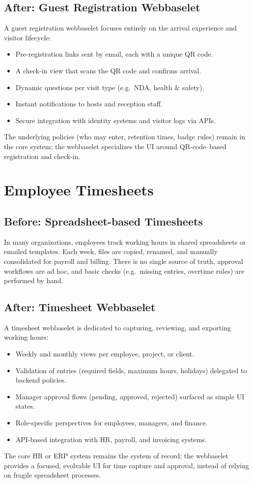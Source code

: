 \subsection*{After: Guest Registration Webbaselet}
A guest registration webbaselet focuses entirely on the arrival
experience and visitor lifecycle:
\begin{itemize}
  \item Pre-registration links sent by email, each with a unique QR code.
  \item A check-in view that scans the QR code and confirms arrival.
  \item Dynamic questions per visit type (e.g.\ NDA, health \& safety).
  \item Instant notifications to hosts and reception staff.
  \item Secure integration with identity systems and visitor logs via APIs.
\end{itemize}
The underlying policies (who may enter, retention times, badge
rules) remain in the core system; the webbaselet specializes the
UI around QR-code–based registration and check-in.

\section{Employee Timesheets}

\subsection*{Before: Spreadsheet-based Timesheets}
In many organizations, employees track working hours in shared
spreadsheets or emailed templates. Each week, files are copied,
renamed, and manually consolidated for payroll and billing. There
is no single source of truth, approval workflows are ad hoc, and
basic checks (e.g.\ missing entries, overtime rules) are performed
by hand.

\subsection*{After: Timesheet Webbaselet}
A timesheet webbaselet is dedicated to capturing, reviewing, and
exporting working hours:
\begin{itemize}
  \item Weekly and monthly views per employee, project, or client.
  \item Validation of entries (required fields, maximum hours, holidays)
        delegated to backend policies.
  \item Manager approval flows (pending, approved, rejected) surfaced
        as simple UI states.
  \item Role-specific perspectives for employees, managers, and finance.
  \item API-based integration with HR, payroll, and invoicing systems.
\end{itemize}
The core HR or ERP system remains the system of record; the webbaselet
provides a focused, evolvable UI for time capture and approval, instead
of relying on fragile spreadsheet processes.

